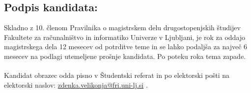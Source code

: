 \documentclass[a4paper,11pt]{article}
\begin{document}



\subsection*{Podpis kandidata:}
\vspace*{2\baselineskip}
\singlespacing

\vfill
\noindent\makebox[\linewidth]{\rule{\textwidth}{0.4pt}}
Skladno z 10. členom Pravilnika o magistrskem delu drugostopenjskih študijev Fakultete za računalništvo in informatiko Univerze v Ljubljani, je rok za oddajo magistrskega dela 12 mesecev od potrditve teme in se lahko podaljša za največ 6 mesecev na podlagi utemeljene prošnje kandidata. Po poteku roka tema zapade. 
\\\\
Kandidat obrazec odda pisno v Študentski referat in po elektorski pošti na elektorski naslov: \href{mailto:zdenka.velikonja@fri.uni-lj.si}{zdenka.velikonja@fri.uni-lj.si}
.  
\end{document}
